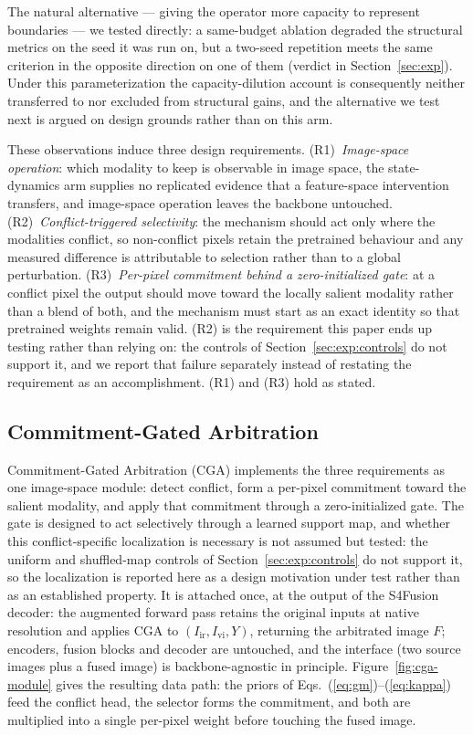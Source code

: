 \documentclass[pdflatex,sn-mathphys-num]{sn-jnl}
\theoremstyle{thmstyleone}%
\theoremstyle{thmstyletwo}%
\theoremstyle{thmstylethree}%
\begin{document}
The natural alternative --- giving the operator more capacity to represent boundaries --- we tested directly: a same-budget ablation degraded the structural metrics on the seed it was run on, but a two-seed repetition meets the same criterion in the opposite direction on one of them (verdict in Section~\ref{sec:exp}). Under this parameterization the capacity-dilution account is consequently neither transferred to nor excluded from structural gains, and the alternative we test next is argued on design grounds rather than on this arm.

These observations induce three design requirements. (R1)~\emph{Image-space operation}: which modality to keep is observable in image space, the state-dynamics arm supplies no replicated evidence that a feature-space intervention transfers, and image-space operation leaves the backbone untouched. (R2)~\emph{Conflict-triggered selectivity}: the mechanism should act only where the modalities conflict, so non-conflict pixels retain the pretrained behaviour and any measured difference is attributable to selection rather than to a global perturbation. (R3)~\emph{Per-pixel commitment behind a zero-initialized gate}: at a conflict pixel the output should move toward the locally salient modality rather than a blend of both, and the mechanism must start as an exact identity so that pretrained weights remain valid. (R2) is the requirement this paper ends up testing rather than relying on: the controls of Section~\ref{sec:exp:controls} do not support it, and we report that failure separately instead of restating the requirement as an accomplishment. (R1) and (R3) hold as stated.

\subsection{Commitment-Gated Arbitration}\label{sec:methods:cga}

Commitment-Gated Arbitration (CGA) implements the three requirements as one image-space module: detect conflict, form a per-pixel commitment toward the salient modality, and apply that commitment through a zero-initialized gate. The gate is designed to act selectively through a learned support map, and whether this conflict-specific localization is necessary is not assumed but tested: the uniform and shuffled-map controls of Section~\ref{sec:exp:controls} do not support it, so the localization is reported here as a design motivation under test rather than as an established property. It is attached once, at the output of the S4Fusion decoder: the augmented forward pass retains the original inputs at native resolution and applies CGA to $(I_{\mathrm{ir}}, I_{\mathrm{vi}}, Y)$, returning the arbitrated image $F$; encoders, fusion blocks and decoder are untouched, and the interface (two source images plus a fused image) is backbone-agnostic in principle. Figure~\ref{fig:cga-module} gives the resulting data path: the priors of Eqs.~(\ref{eq:gm})--(\ref{eq:kappa}) feed the conflict head, the selector forms the commitment, and both are multiplied into a single per-pixel weight before touching the fused image.
\end{document}
